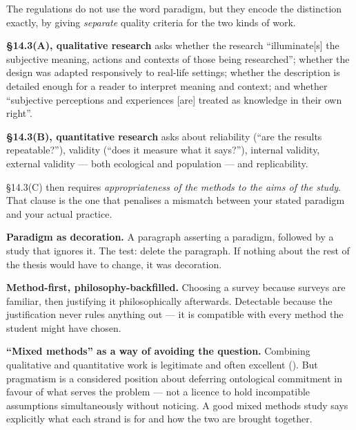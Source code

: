 \begin{regbox}
The regulations do not use the word paradigm, but they encode the distinction
exactly, by giving \emph{separate} quality criteria for the two kinds of work.

\medskip
\textbf{\S14.3(A), qualitative research} asks whether the research
``illuminate[s] the subjective meaning, actions and contexts of those being
researched''; whether the design was adapted responsively to real-life
settings; whether the description is detailed enough for a reader to interpret
meaning and context; and whether ``subjective perceptions and experiences
[are] treated as knowledge in their own right''.

\medskip
\textbf{\S14.3(B), quantitative research} asks about reliability
(``are the results repeatable?''), validity (``does it measure what it
says?''), internal validity, external validity --- both ecological and
population --- and replicability.

\medskip
\S14.3(C) then requires \emph{appropriateness of the methods to the aims of the
study}. That clause is the one that penalises a mismatch between your stated
paradigm and your actual practice.
\end{regbox}

\begin{pitfall}
\textbf{Paradigm as decoration.} A paragraph asserting a paradigm, followed by
a study that ignores it. The test: delete the paragraph. If nothing about the
rest of the thesis would have to change, it was decoration.

\medskip
\textbf{Method-first, philosophy-backfilled.} Choosing a survey because surveys
are familiar, then justifying it philosophically afterwards. Detectable because
the justification never rules anything out --- it is compatible with every
method the student might have chosen.

\medskip
\textbf{``Mixed methods'' as a way of avoiding the question.} Combining
qualitative and quantitative work is legitimate and often excellent
(). But pragmatism is a considered position about deferring
ontological commitment in favour of what serves the problem --- not a licence
to hold incompatible assumptions simultaneously without noticing. A good mixed
methods study says explicitly what each strand is for and how the two are
brought together.
\end{pitfall}

